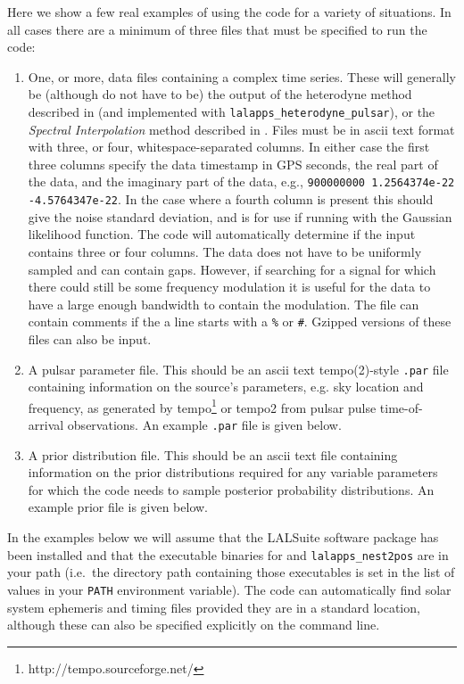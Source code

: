 Here we show a few real examples of using the code for a variety of situations. In all cases there are a minimum of
three files that must be specified to run the code:
\begin{enumerate}
 \item One, or more, data files containing a complex time series. These will generally be (although do not have to be) the output
 of the heterodyne method described in \citep{2005PhRvD..72j2002D} (and implemented with {\tt lalapps\_heterodyne\_pulsar}), or
 the {\it Spectral Interpolation} method described in \citep{2017CQGra..34a5010D}. Files must be in ascii text format with three, or
 four, whitespace-separated columns. In either case the first three columns specify the data timestamp in GPS seconds, the real part of
 the data, and the imaginary part of the data, e.g., \verb|900000000 1.2564374e-22 -4.5764347e-22|. In the case where a fourth column
 is present this should give the noise standard deviation, and is for use if running with the Gaussian likelihood function. The code will
 automatically determine if the input contains three or four columns. The data does not have to be uniformly sampled and can 
 contain gaps. However, if searching for a signal for which there could still be some frequency modulation it is useful for the data to have a large
 enough bandwidth to contain the modulation. The file can contain comments if the a line starts with a \verb|%| or \verb|#|. Gzipped versions of these
 files can also be input.
 \item A pulsar parameter file. This should be an ascii text {\sc tempo(2)}-style \verb|.par| file containing information on the
 source's parameters, e.g. sky location and frequency, as generated by {\sc tempo}\footnote{http://tempo.sourceforge.net/} or
 {\sc tempo2} \citep{2006MNRAS.369..655H}  from pulsar pulse time-of-arrival observations. An example \verb|.par| file is given below.
 \item A prior distribution file. This should be an ascii text file containing information on the prior distributions
 required for any variable parameters for which the code needs to sample posterior probability distributions. An example
 prior file is given below.
\end{enumerate}

In the examples below we will assume that the LALSuite software package \citep{lalsuite} has
been installed and that the executable binaries for \lppen and {\tt lalapps\_nest2pos} are in your path (i.e.\ the directory path containing those
executables is set in the list of values in your {\tt PATH} environment variable). The code can automatically find solar system ephemeris and timing
files provided they are in a standard location, although these can also be specified explicitly on the command line.

